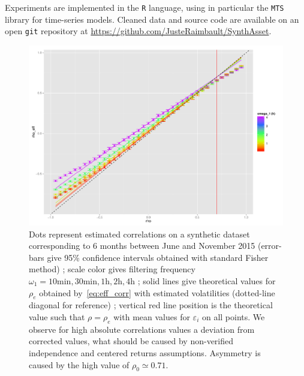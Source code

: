 \documentclass{bmcart}
\begin{document}

Experiments are implemented in the \texttt{R} language, using in particular the \texttt{MTS}~\cite{Tsay:2015xy} library for time-series models. Cleaned data and source code are available on an open \texttt{git} repository at \url{https://github.com/JusteRaimbault/SynthAsset}.



\begin{figure}[h!]
\centering
\includegraphics[width=\columnwidth]{figures/effectiveCorrs_withGoodTh_A4}
\caption{ Dots represent estimated correlations on a synthetic dataset corresponding to 6 months between June and November 2015 (error-bars give 95\% confidence intervals obtained with standard Fisher method) ; scale color gives filtering frequency $\omega_1=10\textrm{min},30\textrm{min},1\textrm{h},2\textrm{h},4\textrm{h}$ ; solid lines give theoretical values for $\rho_e$ obtained by~\ref{eq:eff_corr} with estimated volatilities (dotted-line diagonal for reference) ; vertical red line position is the theoretical value such that $\rho = \rho_e$ with mean values for $\varepsilon_i$ on all points. We observe for high absolute correlations values a deviation from corrected values, what should be caused by non-verified independence and centered returns assumptions. Asymmetry is caused by the high value of $\rho_0 \simeq 0.71$.}
\label{fig:effective_corrs}
\end{figure}
\end{document}
